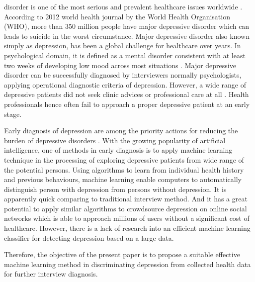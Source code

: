\documentclass[10pt,journal,compsoc]{IEEEtran}
\begin{document}
% 
% 
% 
% 
 disorder is one of the most serious and prevalent healthcare issues worldwide \cite{Wongkoblap}. According to 2012 world health journal by the World Health Organisation (WHO), more than 350 million people have major depressive disorder which can leads to suicide in the worst circumstance. Major depressive disorder also known simply as depression, has been a global challenge for healthcare over years. In psychological domain, it is defined as a mental disorder consistent with at least two weeks of developing low mood across most situations \cite{Zimmerman}. Major depressive disorder can be successfully diagnosed by interviewers normally psychologists, applying operational diagnostic criteria of depression. However, a wide range of depressive patients did not seek clinic advices or professional care at all \cite{Huerta-Ramirez}. Health professionals hence often fail to approach a proper depressive patient at an early stage. 

Early diagnosis of depression are among the priority actions for reducing the burden of depressive disorders \cite{Huerta-Ramirez}. With the growing popularity of artificial intelligence, one of methods in early diagnosis is to apply machine learning technique in the processing of exploring depressive patients from wide range of the potential persons. Using algorithms to learn from individual health history and previous behaviours, machine learning enable computers to automatically distinguish person with depression from persons without depression. It is apparently quick comparing to traditional interview method. And it has a great potential to apply similar algorithms to crowdsource depression on online social networks which is able to approach millions of users without a significant cost of healthcare. However, there is a lack of research into an efficient machine learning classifier for detecting depression based on a large data.

Therefore, the objective of the present paper is to propose a suitable effective machine learning method in discriminating depression from collected health data for further interview diagnosis. 
%
%
%
%
\end{document}
